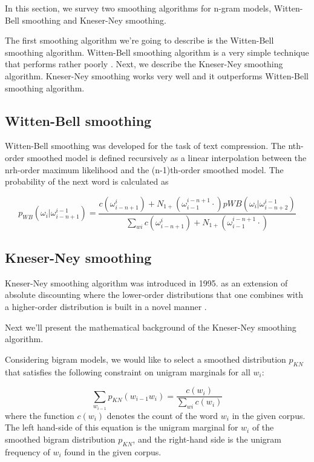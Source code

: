 \documentclass[twoside]{article}
\begin{document}
\begin{multicols}{2}
In this section, we survey two smoothing algorithms for n-gram models, Witten-Bell smoothing and Kneser-Ney smoothing. 

The first smoothing algorithm we\rq{}re going to describe is the Witten-Bell smoothing algorithm. Witten-Bell smoothing algorithm is a very simple technique that performs rather poorly \cite{1_chen1999empirical}. Next, we describe the Kneser-Ney smoothing algorithm. Kneser-Ney smoothing works very well and it outperforms Witten-Bell smoothing algorithm.

\subsection{Witten-Bell smoothing}
Witten-Bell smoothing was developed for the task of text compression. The nth-order smoothed model is defined recursively as a linear interpolation between the nrh-order maximum likelihood and the (n-1)th-order smoothed model. The probability of the next word is calculated as

\begin{equation}
p_{WB}(\omega_i|\omega_{i-n+1}^{i-1})=\frac{c(\omega_{i-n+1}^{i}) + N_{1+}(\omega_{i-1}^{i-n+1}\cdot)p{WB}(\omega_i|\omega_{i-n+2}^{i-1})}{\sum_{wi}c(\omega_{i-n+1}^{i}) + N_{1+}(\omega_{i-1}^{i-n+1}\cdot)}
\end{equation}

\subsection{Kneser-Ney smoothing}
Kneser-Ney smoothing algorithm was introduced in 1995. as an extension of absolute discounting where the lower-order distributions that one combines with a higher-order distribution is built in a novel manner \cite{1_chen1999empirical}. 

Next we\rq{}ll present the mathematical background of the Kneser-Ney smoothing algorithm.

Considering bigram models, we would like to select a smoothed distribution $p_{KN}$ that satisfies the following constraint on unigram marginals for all $w_i$:

\begin{equation}
\sum_{w_{i - 1}} p_{KN}(w_{i-1}w_{i} ) = \frac{c(w_{i})}{\sum_{w{i}} c(w_{i})}
\end{equation}
where the function $c(w_{i})$ denotes the count of the word $w_{i}$ in the given corpus. The left hand-side of this equation is the unigram marginal for $w_{i}$ of the smoothed bigram distribution $p_{KN}$, and the right-hand side is the unigram frequency of $w_{i}$ found in the given corpus.


\end{multicols}
\end{document}
